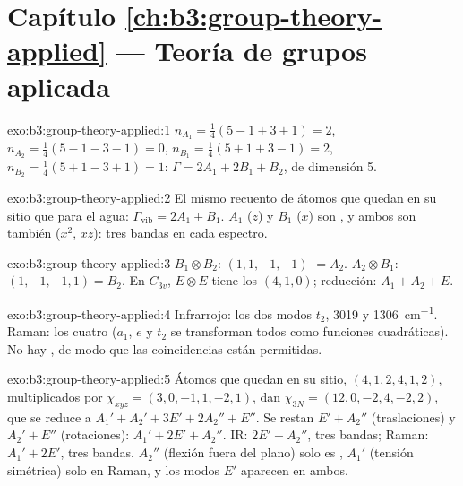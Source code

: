 \section*{Capítulo \ref{ch:b3:group-theory-applied} --- Teoría de grupos aplicada}

\begin{solution}{exo:b3:group-theory-applied:1}
$n_{A_1} = \frac14(5 - 1 + 3 + 1) = 2$, $n_{A_2} = \frac14(5 - 1 - 3 - 1) = 0$,
$n_{B_1} = \frac14(5 + 1 + 3 - 1) = 2$, $n_{B_2} = \frac14(5 + 1 - 3 + 1) = 1$:
$\Gamma = 2A_1 + 2B_1 + B_2$, de dimensión 5.
\end{solution}

\begin{solution}{exo:b3:group-theory-applied:2}
El mismo recuento de átomos que quedan en su sitio que para el agua: $\Gamma_{\mathrm{vib}} = 2A_1 + B_1$. $A_1$ ($z$) y
$B_1$ ($x$) son , y ambos son también  ($x^2$, $xz$): tres
bandas en cada espectro.
\end{solution}

\begin{solution}{exo:b3:group-theory-applied:3}
$B_1\otimes B_2$:  $(1, 1, -1, -1)$ $= A_2$. $A_2\otimes B_1$: $(1, -1, -1,
1) = B_2$. En $C_{3v}$, $E\otimes E$ tiene los  $(4, 1, 0)$; reducción: $A_1 + A_2 +
E$.
\end{solution}

\begin{solution}{exo:b3:group-theory-applied:4}
Infrarrojo: los dos modos $t_2$, 3019 y \qty{1306}{cm^{-1}}. Raman: los cuatro ($a_1$,
$e$ y $t_2$ se transforman todos como funciones cuadráticas). No hay , de modo que
las coincidencias están permitidas.
\end{solution}

\begin{solution}{exo:b3:group-theory-applied:5}
Átomos que quedan en su sitio, $(4, 1, 2, 4, 1, 2)$, multiplicados por $\chi_{xyz} = (3, 0, -1, 1, -2, 1)$, dan
$\chi_{3N} = (12, 0, -2, 4, -2, 2)$, que se reduce a $A_1' + A_2' + 3E' + 2A_2'' +
E''$. Se restan $E' + A_2''$ (traslaciones) y $A_2' + E''$ (rotaciones): $A_1' + 2E'
+ A_2''$. IR: $2E' + A_2''$, tres bandas; Raman: $A_1' + 2E'$, tres bandas. $A_2''$
(flexión fuera del plano) solo es , $A_1'$ (tensión simétrica) solo en Raman, y los modos
$E'$ aparecen en ambos.
\end{solution}

